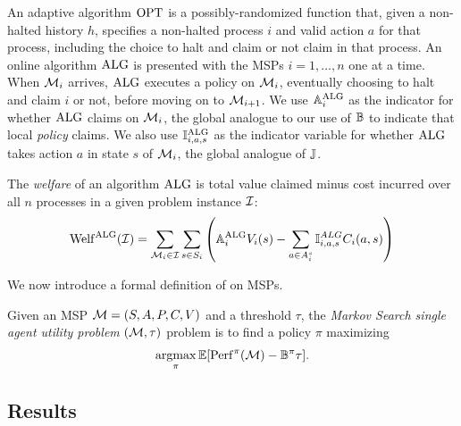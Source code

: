 An adaptive algorithm $\mathrm{OPT}$ is a possibly-randomized function that, given a non-halted history $h$, specifies a non-halted process $i$ and valid action $a$ for that process, including the choice to halt and claim or not claim in that process.
An online algorithm $\mathrm{ALG}$ is presented with the MSPs $i=1,\dots,n$ one at a time.
When $\mathcal{M}_i$ arrives, $\mathrm{ALG}$ executes a policy on $\mathcal{M}_i$, eventually choosing to halt and claim $i$ or not, before moving on to $\mathcal{M}_{i+1}$.
We use $\mathbb{A}^{\mathrm{ALG}}_i$ as the indicator for whether $\mathrm{ALG}$ claims on $\mathcal{M}_i$, the global analogue to our use of $\mathbb{B}$ to indicate that local \emph{policy} claims.
We also use $\mathbb{I}^{\mathrm{ALG}}_{i,a,s}$ as the indicator variable for whether $\mathrm{ALG}$ takes action $a$ in state $s$ of $\mathcal{M}_i$, the global analogue of $\mathbb{J}$.

The \emph{welfare} of an algorithm $\mathrm{ALG}$ is total value claimed minus cost incurred over all $n$ processes in a given problem instance $\mathcal{I}$:
\[  \mathrm{Welf}^{\mathrm{ALG}}(\mathcal{I}) = \sum_{\mathcal{M}_i \in \mathcal{I}} \sum_{s \in S_i} \left( \mathbb{A}^{\mathrm{ALG}}_i V_i(s) - \sum_{a \in A_i^s} \mathbb{I}^{ALG}_{i,a,s} C_i(a,s) \right)  \]

We now introduce a formal definition of \SAUP{} on MSPs.
\begin{definition}
	
	Given an MSP $\mathcal{M}=(S,A,P,C,V)$ and a threshold $\tau$, the \emph{Markov Search single agent utility problem} \SAUP$(\mathcal{M},\tau)$ problem is to find a policy $\pi$ maximizing
	\begin{align*}
		\operatorname*{argmax}_\pi \operatorname*{\mathbb{E}}[\mathrm{Perf}^{\pi}(\mathcal{M}) - \mathbb{B}^{\pi} \tau] 
		.
	\end{align*}
\end{definition}


\subsection{Results}


